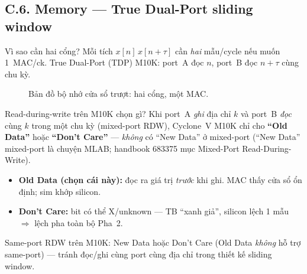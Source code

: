 \subsection*{C.6. Memory --- True Dual-Port sliding window}

\begin{firstprin}{Vì sao cần hai cổng?}
Mỗi tích $x[n]\,x[n+\tau]$ cần \emph{hai} mẫu/cycle nếu muốn 1~MAC/ck. True Dual-Port (TDP) M10K: port~A đọc $n$, port~B đọc $n+\tau$ cùng chu kỳ.
\end{firstprin}

\begin{figure}[H]
\centering
{}
\caption{Bản đồ bộ nhớ cửa sổ trượt: hai cổng, một MAC.}
\label{fig:tdp_sliding}
\end{figure}

\begin{firstprin}{Read-during-write trên M10K chọn gì?}
Khi port~A \emph{ghi} địa chỉ $k$ và port~B \emph{đọc} cùng $k$ trong một chu kỳ (mixed-port RDW), Cyclone~V M10K chỉ cho \textbf{``Old Data''} hoặc \textbf{``Don't Care''} --- \emph{không} có ``New Data'' ở mixed-port (``New Data'' mixed-port là chuyện MLAB; handbook 683375 mục Mixed-Port Read-During-Write).
\begin{itemize}[leftmargin=*,itemsep=1pt]
  \item \textbf{Old Data (chọn cái này):} đọc ra giá trị \emph{trước} khi ghi. MAC thấy cửa sổ ổn định; sim khớp silicon.
  \item \textbf{Don't Care:} bit có thể X/unknown --- TB ``xanh giả'', silicon lệch 1 mẫu $\Rightarrow$ lệch pha toàn bộ Pha~2.
\end{itemize}
Same-port RDW trên M10K: New Data hoặc Don't Care (Old Data \emph{không} hỗ trợ same-port) --- tránh đọc/ghi cùng port cùng địa chỉ trong thiết kế sliding window.
\end{firstprin}

